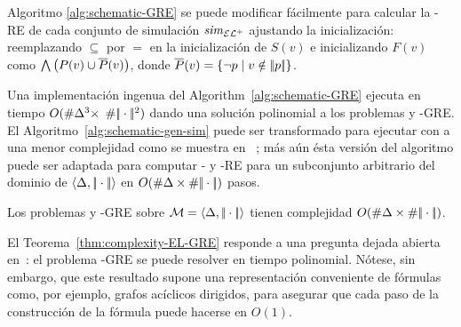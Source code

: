 Algoritmo \ref{alg:schematic-GRE} se puede modificar f\'acilmente para
calcular la \ELAN-RE de cada conjunto de simulaci\'on ${\it sim}_{{\mathcal{EL}^+}}$ 
ajustando la inicializaci\'on: reemplazando $\subseteq$ por $=$ en la
inicializaci\'on de $S(v)$ e inicializando $F(v)$ como
$\bigwedge\left(P(v)\cup\overline {P}(v)\right)$,
donde $\overline {P}(v)=\{\lnot p\mid v\notin|\!|p|\!|\}$.


Una implementaci\'on ingenua del Algorithm~\ref{alg:schematic-GRE}
ejecuta en tiempo $O(\# \Delta^3\times$
$\# |\!|\cdot|\!|^2)$
dando una soluci\'on polinomial a los problemas \EL y \ELAN-GRE.
El Algoritmo~\ref{alg:schematic-gen-sim} puede ser transformado para ejecutar con a una menor complejidad como se muestra en
~\cite{HHK95}; m\'as a\'un \'esta versi\'on del algoritmo puede ser adaptada para
computar \EL- y \ELAN-RE para un subconjunto arbitrario del dominio de $\langle \Delta,|\!|\cdot|\!| \rangle$
 en $O(\# \Delta\times\# |\!|\cdot|\!|)$ pasos. 


%

%
\begin{theorem}\label{thm:complexity-EL-GRE}
Los problemas \EL y \ELAN-GRE sobre $\mathcal{M}=\langle \Delta,|\!|\cdot|\!| \rangle$ tienen complejidad
$O(\# \Delta\times\# |\!|\cdot|\!|)$.
\end{theorem}



El Teorema~\ref{thm:complexity-EL-GRE} responde a una pregunta dejada abierta
en~\cite{areces08}: el problema \EL-GRE se puede resolver en tiempo polinomial. N\'otese, sin embargo, que este resultado supone una representaci\'on conveniente de
f\'ormulas como, por ejemplo, grafos ac\'iclicos dirigidos, para asegurar que
cada paso de la construcci\'on de la f\'ormula puede hacerse en $O(1)$. %

